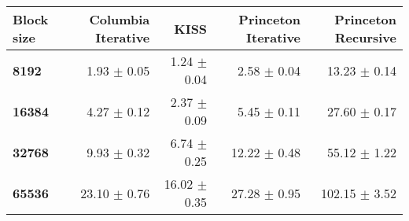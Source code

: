 \begin{tabular}{lrrrr}\toprule
\textbf{Block size}  & \textbf{Columbia Iterative} & \textbf{KISS} & \textbf{Princeton Iterative} & \textbf{Princeton Recursive}\\\midrule
\textbf{8192}  & 1.93 $\pm$ 0.05 & 1.24 $\pm$ 0.04 & 2.58 $\pm$ 0.04 & 13.23 $\pm$ 0.14\\
\textbf{16384}  & 4.27 $\pm$ 0.12 & 2.37 $\pm$ 0.09 & 5.45 $\pm$ 0.11 & 27.60 $\pm$ 0.17\\
\textbf{32768}  & 9.93 $\pm$ 0.32 & 6.74 $\pm$ 0.25 & 12.22 $\pm$ 0.48 & 55.12 $\pm$ 1.22\\
\textbf{65536} & 23.10 $\pm$ 0.76 & 16.02 $\pm$ 0.35 & 27.28 $\pm$ 0.95 & 102.15 $\pm$ 3.52\\
\bottomrule
\end{tabular}
